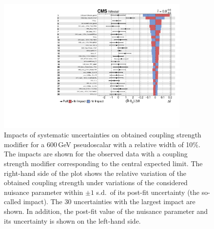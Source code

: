 \begin{figure}[!Hhtb]
\centering
\includegraphics[width=0.85\textwidth,keepaspectratio=true]{fig/app5/impacts/impacts_600_obs.pdf}
\caption{Impacts of systematic uncertainties on obtained coupling strength modifier for a 600\,GeV pseudoscalar with a relative width of 10\%. The impacts are shown for the observed data with a coupling strength modifier corresponding to the central expected limit. The right-hand side of the plot shows the relative variation of the obtained coupling strength under variations of the considered nuisance parameter within $\pm 1$ s.d.\ of its post-fit uncertainty (the so-called impact). The 30 uncertainties with the largest impact are shown. In addition, the post-fit value of the nuisance parameter and its uncertainty is shown on the left-hand side.}
\label{fig:iimpacts_obs_m600}
\end{figure}

